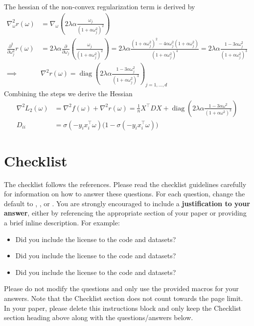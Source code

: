 \documentclass{article}
\begin{document}
%
The hessian of the non-convex regularization term is derived by
\begin{align*}
\nabla ^2 _\omega r(\omega) &= \nabla _\omega \left(2 \lambda \alpha \frac{\omega_j}{(1 + \alpha \omega_j^2)^2} \right)\\
%
\frac{\partial^2}{\partial \omega_j^2} r(\omega) 
&= 2 \lambda \alpha \frac{\partial}{\partial \omega_j} \left( \frac{\omega_j}{(1 + \alpha \omega_j^2)^2} \right)
= 2 \lambda \alpha \frac{(1 + \alpha \omega_j^2)^2 - 4 \alpha \omega_j^2 (1 + \alpha \omega_j^2)}{(1 + \alpha \omega_j^2)^4}
= 2 \lambda \alpha \frac{1 - 3 \alpha \omega_j^2}{(1 + \alpha \omega_j^2)^3} \\
\implies & \nabla^2 r(\omega) = \operatorname{diag}\left(2 \lambda \alpha \frac{1 - 3 \alpha \omega_j^2}{(1 + \alpha \omega_j^2)^3}\right)_{j=1,\ldots,d}
\end{align*}
Combining the steps we derive the Hessian
\begin{align*}
\nabla^2 L_2(\omega) &= \nabla^2 f(\omega) + \nabla^2 r(\omega)
= \frac{1}{n} X^\top D X + \operatorname{diag}\left(2 \lambda \alpha \frac{1 - 3 \alpha \omega^2}{(1 + \alpha \omega^2)^3}\right) \\
D_{ii} &= \sigma(-y_i x_i^\top \omega) \big(1 - \sigma(-y_i x_i^\top \omega)\big)
\end{align*}




\section*{Checklist}


The checklist follows the references.  Please
read the checklist guidelines carefully for information on how to answer these
questions.  For each question, change the default \answerTODO{} to \answerYes{},
\answerNo{}, or \answerNA{}.  You are strongly encouraged to include a {\bf
justification to your answer}, either by referencing the appropriate section of
your paper or providing a brief inline description.  For example:
\begin{itemize}
  \item Did you include the license to the code and datasets? 
  \item Did you include the license to the code and datasets? 
  \item Did you include the license to the code and datasets? \answerNA{}
\end{itemize}
Please do not modify the questions and only use the provided macros for your
answers.  Note that the Checklist section does not count towards the page
limit.  In your paper, please delete this instructions block and only keep the
Checklist section heading above along with the questions/answers below.
\end{document}
